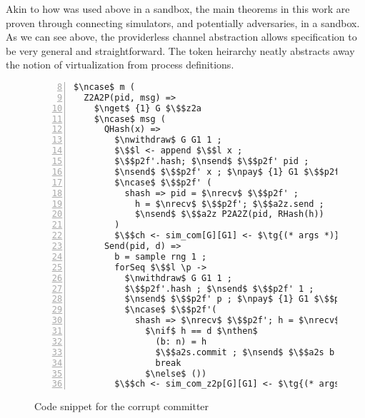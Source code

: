 Akin to how \Fro was used above in a sandbox, the main theorems in this work are proven through connecting simulators, and potentially adversaries, in a sandbox. 
As we can see above, the providerless channel abstraction allows specification to be very general and straightforward. 
The token heirarchy neatly abstracts away the notion of virtualization from process definitions. 


\begin{figure}
\begin{lstlisting}[basicstyle=\footnotesize\BeraMonottFamily, mathescape, frame=single, numbers=left, xleftmargin=2em, xrightmargin=0.9em, firstnumber=8]
$\ncase$ m (
  Z2A2P(pid, msg) =>
    $\nget$ {1} G $\$$z2a
    $\ncase$ msg (
      QHash(x) => 
        $\nwithdraw$ G G1 1 ;
        $\$$l <- append $\$$l x ;
        $\$$p2f'.hash; $\nsend$ $\$$p2f' pid ; 
        $\nsend$ $\$$p2f' x ; $\npay$ {1} G1 $\$$p2f' ;
        $\ncase$ $\$$p2f' (
          shash => pid = $\nrecv$ $\$$p2f' ; 
            h = $\nrecv$ $\$$p2f'; $\$$a2z.send ; 
            $\nsend$ $\$$a2z P2A2Z(pid, RHash(h))
        )
        $\$$ch <- sim_com[G][G1] <- $\tg{(* args *)}$
      Send(pid, d) =>
        b = sample rng 1 ;
        forSeq $\$$l \p ->
          $\nwithdraw$ G G1 1 ;
          $\$$p2f'.hash ; $\nsend$ $\$$p2f' 1 ; 
          $\nsend$ $\$$p2f' p ; $\npay$ {1} G1 $\$$p2f' ;
          $\ncase$ $\$$p2f'( 
            shash => $\nrecv$ $\$$p2f'; h = $\nrecv$ $\$$p2f'
              $\nif$ h == d $\nthen$
                (b: n) = h 
                $\$$a2s.commit ; $\nsend$ $\$$a2s b ;
                break
              $\nelse$ ())
        $\$$ch <- sim_com_z2p[G][G1] <- $\tg{(* args *)}$)
\end{lstlisting}
\vspace{-0.5em}
\label{fig:corrupt_committer}
\caption{Code snippet for the corrupt committer}
\vspace{-1em}
\end{figure}







